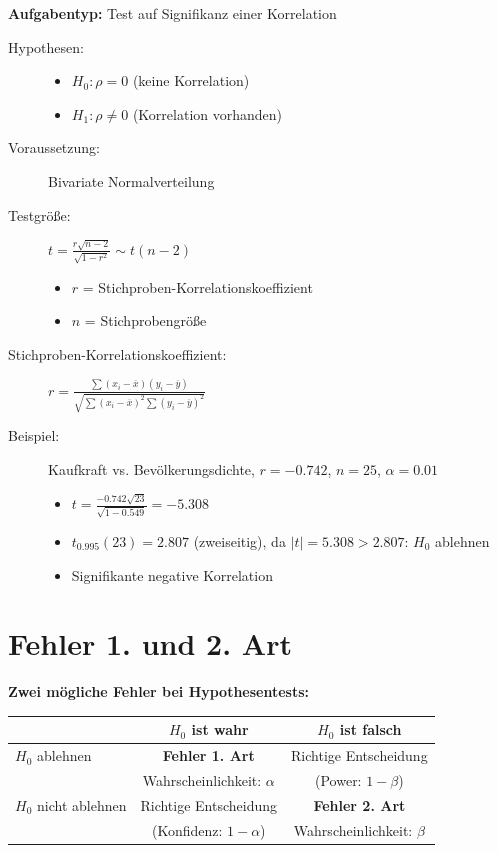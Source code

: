 \documentclass[12pt, a4paper, titlepage, ngerman]{scrartcl}
\begin{document}
\textbf{Aufgabentyp:} Test auf Signifikanz einer Korrelation

\begin{description}
  \item[Hypothesen:] 
    \begin{itemize}
      \item $H_0: \rho = 0$ (keine Korrelation)
      \item $H_1: \rho \neq 0$ (Korrelation vorhanden)
    \end{itemize}
  \item[Voraussetzung:] Bivariate Normalverteilung
  \item[Testgröße:] $t = \frac{r\sqrt{n-2}}{\sqrt{1-r^2}} \sim t(n-2)$
    \begin{itemize}
      \item $r$ = Stichproben-Korrelationskoeffizient
      \item $n$ = Stichprobengröße
    \end{itemize}
  \item[Stichproben-Korrelationskoeffizient:] $r = \frac{\sum (x_i - \overline{x})(y_i - \overline{y})}{\sqrt{\sum(x_i - \overline{x})^2 \sum(y_i - \overline{y})^2}}$
  \item[Beispiel:] Kaufkraft vs. Bevölkerungsdichte, $r = -0.742$, $n = 25$, $\alpha = 0.01$
    \begin{itemize}
      \item $t = \frac{-0.742 \sqrt{23}}{\sqrt{1 - 0.549}} = -5.308$
      \item $t_{0.995}(23) = 2.807$ (zweiseitig), da $|t| = 5.308 > 2.807$: $H_0$ ablehnen
      \item Signifikante negative Korrelation
    \end{itemize}
\end{description}

\newpage

\appendix

\section{Fehler 1. und 2. Art}

\textbf{Zwei mögliche Fehler bei Hypothesentests:}

\begin{table}[h]
  \centering
  \begin{tabular}{l|cc}
    & $H_0$ ist wahr & $H_0$ ist falsch \\
    \hline
    $H_0$ ablehnen & \textbf{Fehler 1. Art} & Richtige Entscheidung \\
    & Wahrscheinlichkeit: $\alpha$ & (Power: $1 - \beta$) \\
    \hline
    $H_0$ nicht ablehnen & Richtige Entscheidung & \textbf{Fehler 2. Art} \\
    & (Konfidenz: $1 - \alpha$) & Wahrscheinlichkeit: $\beta$ \\
  \end{tabular}
\end{table}
\end{document}
